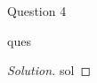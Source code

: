 \begin{solution}{Question 4}\label{ques:4}
    \begin{question}
        ques
    \end{question}
    \tcblower{}
    \begin{proof}[Solution]
        sol
    \end{proof}
\end{solution}

